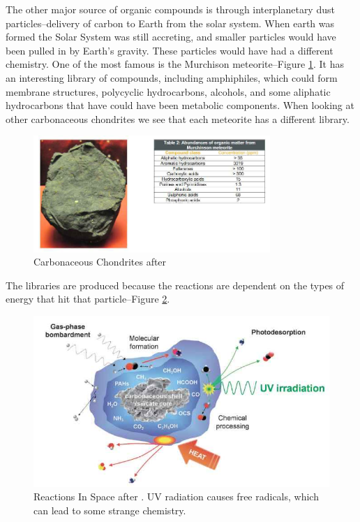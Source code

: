\documentclass[]{article}
\begin{document}
The other major source of organic compounds is through interplanetary dust particles--delivery of carbon to Earth from the solar system. When earth was formed the Solar System was still accreting, and smaller particles would have been pulled in by Earth's gravity.  These particles would have had a different chemistry. One of the most famous is the Murchison meteorite--Figure \ref{fig:CarbonaceousChondrites}. It has an interesting library of compounds, including amphiphiles, which could form membrane structures, polycyclic hydrocarbons, alcohols, and some aliphatic hydrocarbons that have could have been metabolic components. When looking at other carbonaceous chondrites  we see that each meteorite has a different library.
\begin{figure}[H]
	\caption[Carbonaceous Chondrites]{Carbonaceous Chondrites after \cite{ehrenfreund2002astrophysical}}\label{fig:CarbonaceousChondrites}
	\includegraphics[width=0.8\textwidth]{CarbonaceousChondrites}
\end{figure}

The libraries are produced because the reactions are dependent on the types of energy that hit that particle--Figure \ref{fig:ReactionsInSpace}.

\begin{figure}[H]
	\caption[Reactions In Space]{Reactions In Space after \cite{dalai2016incubating}. UV radiation causes free radicals, which can lead to some strange chemistry.}\label{fig:ReactionsInSpace}
	\includegraphics[width=\textwidth]{ReactionsInSpace}
\end{figure}
\end{document}
